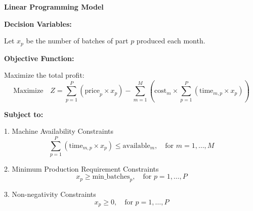 \documentclass{article}
\begin{document}
\textbf{Linear Programming Model}

\textbf{Decision Variables:}

Let \( x_{p} \) be the number of batches of part \( p \) produced each month.

\textbf{Objective Function:}

Maximize the total profit:
\[
\text{Maximize} \quad Z = \sum_{p=1}^{P} (\text{price}_{p} \times x_{p}) - \sum_{m=1}^{M} \left(\text{cost}_{m} \times \sum_{p=1}^{P} (\text{time}_{m,p} \times x_{p})\right)
\]

\textbf{Subject to:}

1. Machine Availability Constraints
\[
\sum_{p=1}^{P} (\text{time}_{m,p} \times x_{p}) \leq \text{available}_{m}, \quad \text{for } m = 1, \ldots, M
\]

2. Minimum Production Requirement Constraints
\[
x_{p} \geq \text{min\_batches}_{p}, \quad \text{for } p = 1, \ldots, P
\]

3. Non-negativity Constraints
\[
x_{p} \geq 0, \quad \text{for } p = 1, \ldots, P
\]
\end{document}

